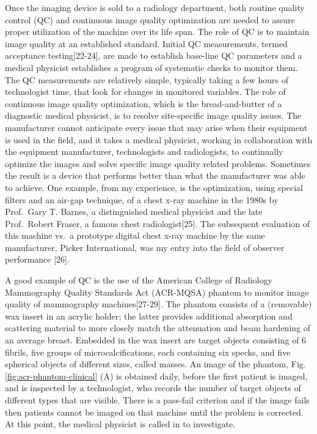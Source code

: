 \documentclass[
]{book}
\begin{document}
Once the imaging device is sold to a radiology department, both routine quality control (QC) and continuous image quality optimization are needed to assure proper utilization of the machine over its life span. The role of QC is to maintain image quality at an established standard. Initial QC measurements, termed acceptance testing{[}22-24{]}, are made to establish base-line QC parameters and a medical physicist establishes a program of systematic checks to monitor them. The QC measurements are relatively simple, typically taking a few hours of technologist time, that look for changes in monitored variables. The role of continuous image quality optimization, which is the bread-and-butter of a diagnostic medical physicist, is to resolve site-specific image quality issues. The manufacturer cannot anticipate every issue that may arise when their equipment is used in the field, and it takes a medical physicist, working in collaboration with the equipment manufacturer, technologists and radiologists, to continually optimize the images and solve specific image quality related problems. Sometimes the result is a device that performs better than what the manufacturer was able to achieve. One example, from my experience, is the optimization, using special filters and an air-gap technique, of a chest x-ray machine in the 1980s by Prof.~Gary T. Barnes, a distinguished medical physicist and the late Prof.~Robert Fraser, a famous chest radiologist{[}25{]}. The subsequent evaluation of this machine vs.~a prototype digital chest x-ray machine by the same manufacturer, Picker International, was my entry into the field of observer performance {[}26{]}.

A good example of QC is the use of the American College of Radiology Mammography Quality Standards Act (ACR-MQSA) phantom to monitor image quality of mammography machines{[}27-29{]}. The phantom consists of a (removable) wax insert in an acrylic holder; the latter provides additional absorption and scattering material to more closely match the attenuation and beam hardening of an average breast. Embedded in the wax insert are target objects consisting of 6 fibrils, five groups of microcalcifications, each containing six specks, and five spherical objects of different sizes, called masses. An image of the phantom, Fig. \ref{fig:acr-phantom-clinical} (A) is obtained daily, before the first patient is imaged, and is inspected by a technologist, who records the number of target objects of different types that are visible. There is a pass-fail criterion and if the image fails then patients cannot be imaged on that machine until the problem is corrected. At this point, the medical physicist is called in to investigate.
\end{document}
